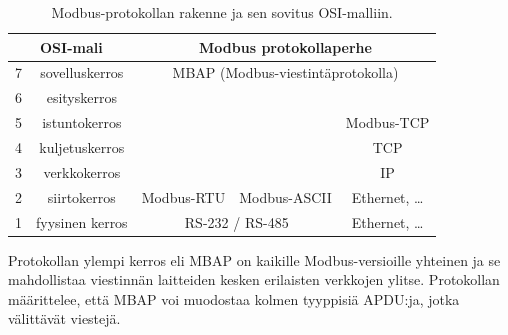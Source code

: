     \begin{table}
      \centering
      \begin{tabular}{|c|c|ccc|}
        \hline
        \multicolumn{2}{|c|}{\gls{OSI}-mali} & \multicolumn{3}{c|}{Modbus protokollaperhe}                                         \\ \hline
        7       & sovelluskerros       & \multicolumn{3}{c|}{\gls{MBAP} (Modbus-viestintäprotokolla)}                                \\ \hline
        6       & esityskerros         &                                 &                                   &                 \\ \cline{1-2} \cline{5-5}
        5       & istuntokerros        &                                 & \multicolumn{1}{c|}{}             & Modbus-\gls{TCP}\\ \cline{1-2} \cline{5-5}
        4       & kuljetuskerros       &                                 & \multicolumn{1}{c|}{}             & \gls{TCP}       \\ \cline{1-2} \cline{5-5}
        3       & verkkokerros         &                                 & \multicolumn{1}{c|}{}             & IP              \\ \hline
        2       & siirtokerros         & \multicolumn{1}{c|}{Modbus-\gls{RTU}} & \multicolumn{1}{c|}{Modbus-\gls{ASCII}} & Ethernet, \dots \\ \hline
        1       & fyysinen kerros      & \multicolumn{2}{c|}{\gls{RS}-232 / \gls{RS}-485}                                & Ethernet, \dots \\ \hline
      \end{tabular}
      \caption[Modbus-protokollan rakenne ja \gls{OSI}-malli]{Modbus-protokollan rakenne ja sen sovitus \gls{OSI}-malliin.\parencite{osi, modbusSerialSpec, modbusTCPIPSpec}}
      \label{rakenne}
    \end{table}

    Protokollan ylempi kerros eli \gls{MBAP} on kaikille Modbus-versioille yhteinen ja se mahdollistaa viestinnän laitteiden kesken erilaisten verkkojen ylitse. Protokollan määrittelee, että \gls{MBAP} voi muodostaa kolmen tyyppisiä \gls{APDU}:ja, jotka välittävät viestejä.
